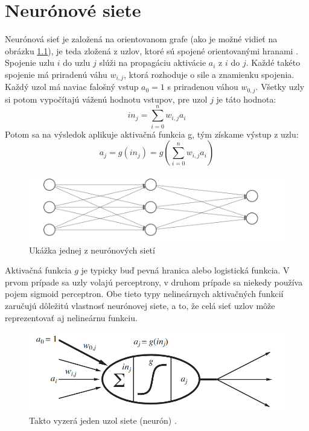 \chapter{Neurónové siete}


Neurónová sieť je založená na orientovanom grafe (ako je možné vidieť na obrázku \ref{fig:nn}), je teda zložená z uzlov, ktoré sú spojené orientovanými hranami \citep{rnn:spol}.
Spojenie uzlu $i$ do uzlu $j$ slúži na propagáciu aktivácie $a_i$ z $i$ do $j$.
Každé takéto spojenie má priradenú váhu $w_{i,j}$, ktorá rozhoduje o sile a znamienku spojenia.
Každý uzol má naviac falošný vstup $a_0=1$ s priradenou váhou $w_{0,j}$.
Všetky uzly si potom vypočítajú váženú hodnotu vstupov, pre uzol $j$ je táto hodnota:
$$in_j=\sum^n_{i=0}w_{i,j}a_i$$
Potom sa na výsledok aplikuje aktivačná funkcia g, tým získame výstup z uzlu:
$$a_j=g(in_j)=g\left(\sum^n_{i=0}w_{i,j}a_i\right)$$

\begin{figure} 
\includegraphics[width=\textwidth]{../img/nn.png}
\caption{Ukážka jednej z neurónových sietí}
\label{fig:nn}
\end{figure}

Aktivačná funkcia $g$ je typicky buď pevná hranica alebo logistická funkcia.
V prvom prípade sa uzly volajú perceptrony, v druhom prípade sa niekedy používa pojem sigmoid perceptron.
Obe tieto typy nelineárnych aktivačných funkcií zaručujú dôležitú vlastnosť neurónovej siete, a to, že celá sieť uzlov môže reprezentovať aj nelineárnu funkciu.

\begin{figure}
\includegraphics[width=\textwidth]{../img/nn_aima_neuron.png}
\caption{Takto vyzerá jeden uzol siete (neurón) \citep{aima}.}
\end{figure}

